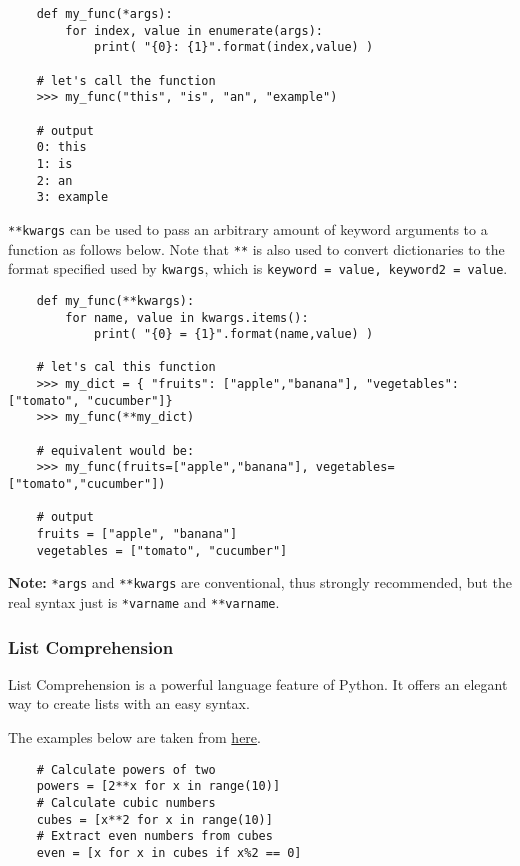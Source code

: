 \documentclass{article}
\begin{document}
\begin{verbatim}
	def my_func(*args):
		for index, value in enumerate(args):
			print( "{0}: {1}".format(index,value) )
	
	# let's call the function
	>>> my_func("this", "is", "an", "example")
	
	# output
 	0: this
 	1: is
 	2: an
 	3: example
\end{verbatim} 

\texttt{**kwargs} can be used to pass an arbitrary amount of keyword arguments to a function as follows below. Note that \texttt{**} is also used to convert dictionaries to the format specified used by \texttt{kwargs}, which is \texttt{keyword = value, keyword2 = value}.

\begin{verbatim}
	def my_func(**kwargs):
		for name, value in kwargs.items():
			print( "{0} = {1}".format(name,value) )
	
	# let's cal this function
	>>> my_dict = { "fruits": ["apple","banana"], "vegetables": ["tomato", "cucumber"]}
	>>> my_func(**my_dict)
	
	# equivalent would be:
	>>> my_func(fruits=["apple","banana"], vegetables=["tomato","cucumber"])
	
	# output
	fruits = ["apple", "banana"]
	vegetables = ["tomato", "cucumber"]
\end{verbatim} 

\textbf{Note:} \texttt{*args} and \texttt{**kwargs} are conventional, thus strongly recommended, but the real syntax just is \texttt{*varname} and \texttt{**varname}.

\subsubsection{List Comprehension}

List Comprehension is a powerful language feature of Python. It offers an elegant way to create lists with an easy syntax.

\bigskip

The examples below are taken from \href{http://www.secnetix.de/olli/Python/list_comprehensions.hawk}{here}.

\bigskip

\begin{verbatim}
	# Calculate powers of two
	powers = [2**x for x in range(10)]
	# Calculate cubic numbers
	cubes = [x**2 for x in range(10)]
	# Extract even numbers from cubes
	even = [x for x in cubes if x%2 == 0]
\end{verbatim}
\end{document}
